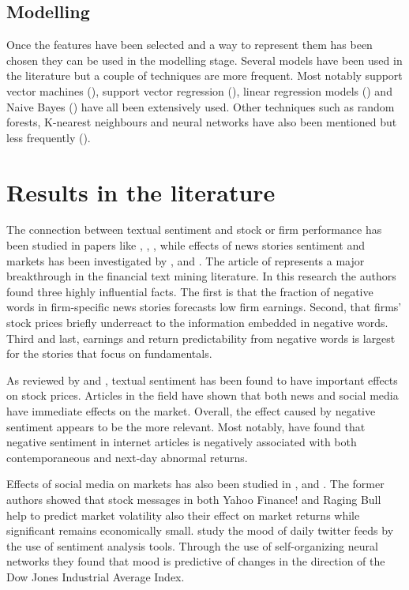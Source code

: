 \documentclass[a4paper, 12pt]{report}
\begin{document}
    \subsection{Modelling}
    Once the features have been selected and a way to represent them has been chosen they can be used in the modelling stage. Several models have been used in the literature but a couple of techniques are more frequent. Most notably support vector machines (\textcite{Mittermayer:2004}), support vector regression (\textcite{Hagenau:2013}), linear regression models (\textcite{Tetlock:2008}) and Naive Bayes (\textcite{Li:2010}) have all been extensively used. Other techniques such as random forests, K-nearest neighbours and neural networks have also been mentioned but less frequently (\textcite{Nassirtoussi:2014}).
    
    \section{Results in the literature}
    
    The connection between textual sentiment and stock or firm performance has been studied in papers like \textcite{Li:2010}, \textcite{Chen:2014}, \textcite{Sinha:2016}, while effects of news stories sentiment and markets has been investigated by \textcite{Tetlock:2007}, \textcite{Tetlock:2008} and \textcite{Garcia:2013}. The article of \textcite{Tetlock:2008} represents a major breakthrough in the financial text mining literature. In this research the authors found three highly influential facts. The first is that the fraction of negative words in firm-specific news stories forecasts low firm earnings. Second, that firms’ stock prices briefly underreact to the information embedded in negative words. Third and last, earnings and return predictability from negative words is largest for the stories that focus on fundamentals.
    
    As reviewed by \textcite{Kearney:2014} and \textcite{Nassirtoussi:2014}, textual sentiment has been found to have important effects on stock prices. Articles in the field have shown that both news and social media have immediate effects on the market. Overall, the effect caused by negative sentiment appears to be the more relevant. Most notably, \textcite{Chen:2014} have found that negative sentiment in internet articles is negatively associated with both contemporaneous and next-day abnormal returns.
    
    Effects of social media on markets has also been studied in \textcite{Antweiler:2004}, and \textcite{Bollen:2011}. The former authors showed that stock messages in both Yahoo Finance! and Raging Bull help to predict market volatility also their effect on market returns while significant remains economically small. \textcite{Bollen:2011} study the mood of daily twitter feeds by the use of sentiment analysis tools. Through the use of self-organizing neural networks they found that mood is predictive of changes in the direction of the Dow Jones Industrial Average Index.
    
\end{document}
